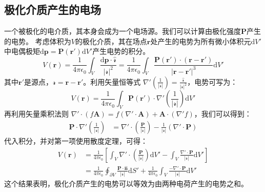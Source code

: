 \documentclass[fontset=none]{ctexart}
\begin{document}
\subsection{极化介质产生的电场}
一个被极化的电介质，其本身会成为一个电场源。我们可以计算由极化强度$\bm{P}$产生的电势。
考虑体积为$V$的极化介质，其在场点$\bm{r}$处产生的电势为所有微小体积元$\mathrm{d}V'$中电偶极矩$\mathrm{d}\bm{p} = \bm{P}(\bm{r}')\mathrm{d}V'$产生电势的积分。
\begin{equation}
    V(\bm{r}) = \frac{1}{4\pi\epsilon_0} \int_V \frac{\mathrm{d}\bm{p} \cdot \hat{\bm{\mathscr{r}}}}{|\bm{\mathscr{r}}|^2} = \frac{1}{4\pi\epsilon_0} \int_V \frac{\bm{P}(\bm{r}') \cdot (\bm{r}-\bm{r}')}{|\bm{r}-\bm{r}'|^3} \mathrm{d}V'
\end{equation}
其中$\bm{r}'$是源点，$\bm{\mathscr{r}} = \bm{r}-\bm{r}'$。利用矢量恒等式 $\nabla' \left(\frac{1}{|\bm{\mathscr{r}}|}\right) = \frac{\hat{\bm{\mathscr{r}}}}{|\bm{\mathscr{r}}|^2}$，电势可写为：
\begin{equation}
    V(\bm{r}) = \frac{1}{4\pi\epsilon_0} \int_V \bm{P}(\bm{r}') \cdot \nabla' \left( \frac{1}{|\bm{\mathscr{r}}|} \right) \mathrm{d}V'
\end{equation}
再利用矢量乘积法则 $\nabla' \cdot (f\bm{A}) = f(\nabla' \cdot \bm{A}) + \bm{A} \cdot (\nabla' f)$，我们可以得到：
\begin{equation}
\begin{aligned}
    \bm{P} \cdot \nabla' \left( \frac{1}{|\bm{\mathscr{r}}|} \right) &= \nabla' \cdot \left( \frac{\bm{P}}{|\bm{\mathscr{r}}|} \right) - \frac{1}{|\bm{\mathscr{r}}|} (\nabla' \cdot \bm{P})
\end{aligned}
\end{equation}
代入积分，并对第一项使用散度定理，可得：
\begin{equation}
\begin{aligned}
    V(\bm{r}) &= \frac{1}{4\pi\epsilon_0} \left[ \int_V \nabla' \cdot \left( \frac{\bm{P}}{|\bm{\mathscr{r}}|} \right) \mathrm{d}V' - \int_V \frac{\nabla' \cdot \bm{P}}{|\bm{\mathscr{r}}|} \mathrm{d}V' \right] \\
    &= \frac{1}{4\pi\epsilon_0} \oint_{\partial V} \frac{\bm{P} \cdot \hat{\bm{n}}}{|\bm{\mathscr{r}}|} \mathrm{d}S' + \frac{1}{4\pi\epsilon_0} \int_V \frac{-\nabla' \cdot \bm{P}}{|\bm{\mathscr{r}}|} \mathrm{d}V'
\end{aligned}
\end{equation}
这个结果表明，极化介质产生的电势可以等效为由两种电荷产生的电势之和。
\end{document}
